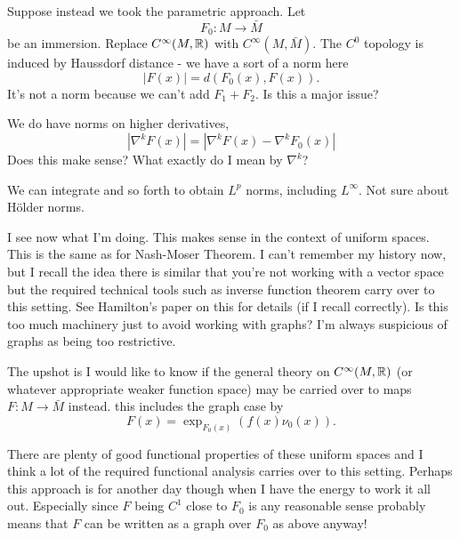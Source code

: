 \documentclass{amsart}
\begin{document}
Suppose instead we took the parametric approach. Let
\[
F_0 : M \to \bar{M}
\]
be an immersion. Replace \(C^{\infty}(M, \mathbb{R})\) with \(C^{\infty} (M, \bar{M})\). The \(C^0\) topology is induced by Haussdorf distance - we have a sort of a norm here
\[
|F(x)| = d(F_0(x), F(x)).
\]
It's not a norm because we can't add $F_1 + F_2$. Is this a major issue?

We do have norms on higher derivatives,
\[
|\nabla^k F (x)| = |\nabla^k F(x) - \nabla^k F_0(x)|
\]
Does this make sense? What exactly do I mean by \(\nabla^k\)? 

We can integrate and so forth to obtain \(L^p\) norms, including \(L^{\infty}\). Not sure about H\"older norms. 

I see now what I'm doing. This makes sense in the context of uniform spaces. This is the same as for Nash-Moser Theorem. I can't remember my history now, but I recall the idea there is similar that you're not working with a vector space but the required technical tools such as inverse function theorem carry over to this setting. See Hamilton's paper on this for details (if I recall correctly). Is this too much machinery just to avoid working with graphs? I'm always suspicious of graphs as being too restrictive.

The upshot is I would like to know if the general theory on \(C^{\infty}(M, \mathbb{R})\) (or whatever appropriate weaker function space) may be carried over to maps \(F : M \to \bar{M}\) instead. this includes the graph case by
\[
F(x) = \exp_{F_0(x)} (f(x) \nu_0(x)).
\]

There are plenty of good functional properties of these uniform spaces and I think a lot of the required functional analysis carries over to this setting. Perhaps this approach is for another day though when I have the energy to work it all out. Especially since \(F\) being \(C^1\) close to \(F_0\) is any reasonable sense probably means that \(F\) can be written as a graph over \(F_0\) as above anyway!



\end{document}
